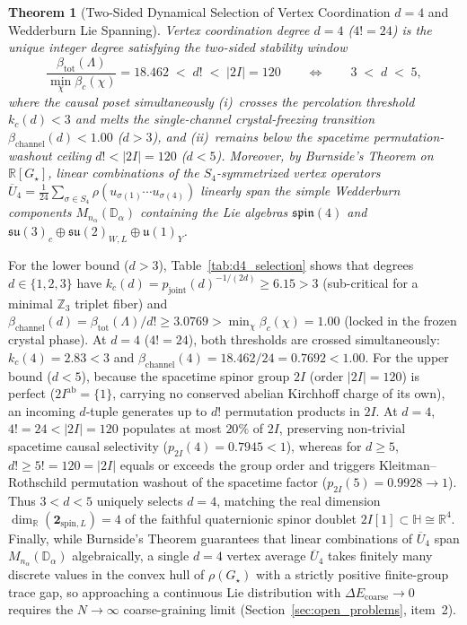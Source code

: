 \documentclass[11pt,a4paper]{article}
\newtheorem{theorem}{Theorem}[section]
\theoremstyle{definition}
\theoremstyle{remark}
\newcommand{\R}{\mathbb{R}}
\newcommand{\quat}{\mathbb{H}}
\newcommand{\Z}{\mathbb{Z}}
\newcommand{\Gstar}{G_\star}
\begin{document}
\begin{theorem}[Two-Sided Dynamical Selection of Vertex Coordination $d=4$ and Wedderburn Lie Spanning]
\label{thm:d4_melting}
Vertex coordination degree $d = 4$ ($4! = 24$) is the unique integer degree satisfying the two-sided stability window
\begin{equation}
\label{eq:d4_window}
\frac{\beta_{\mathrm{tot}}(\Lambda)}{\min_\chi \beta_c(\chi)} = 18.462 \;<\; d! \;<\; |2I| = 120 \qquad\Longleftrightarrow\qquad 3 \;<\; d \;<\; 5,
\end{equation}
where the causal poset simultaneously (i)~crosses the percolation threshold $k_c(d) < 3$ and melts the single-channel crystal-freezing transition $\beta_{\mathrm{channel}}(d) < 1.00$ ($d > 3$), and (ii)~remains below the spacetime permutation-washout ceiling $d! < |2I| = 120$ ($d < 5$). Moreover, by Burnside's Theorem on $\R[\Gstar]$, linear combinations of the $S_4$-symmetrized vertex operators $\overline{U}_4 = \frac{1}{24}\sum_{\sigma \in S_4} \rho(u_{\sigma(1)}\cdots u_{\sigma(4)})$ linearly span the simple Wedderburn components $M_{n_\alpha}(\mathbb{D}_\alpha)$ containing the Lie algebras $\mathfrak{spin}(4)$ and $\mathfrak{su}(3)_c \oplus \mathfrak{su}(2)_{W,L} \oplus \mathfrak{u}(1)_Y$.
\end{theorem}

For the lower bound ($d > 3$), Table~\ref{tab:d4_selection} shows that degrees $d \in \{1, 2, 3\}$ have $k_c(d) = p_{\mathrm{joint}}(d)^{-1/(2d)} \ge 6.15 > 3$ (sub-critical for a minimal $\Z_3$ triplet fiber) and $\beta_{\mathrm{channel}}(d) = \beta_{\mathrm{tot}}(\Lambda)/d! \ge 3.0769 > \min_\chi \beta_c(\chi) = 1.00$ (locked in the frozen crystal phase). At $d = 4$ ($4! = 24$), both thresholds are crossed simultaneously: $k_c(4) = 2.83 < 3$ and $\beta_{\mathrm{channel}}(4) = 18.462 / 24 = 0.7692 < 1.00$. For the upper bound ($d < 5$), because the spacetime spinor group $2I$ (order $|2I| = 120$) is perfect ($2I^{\mathrm{ab}} = \{1\}$, carrying no conserved abelian Kirchhoff charge of its own), an incoming $d$-tuple generates up to $d!$ permutation products in $2I$. At $d = 4$, $4! = 24 < |2I| = 120$ populates at most $20\%$ of $2I$, preserving non-trivial spacetime causal selectivity ($p_{2I}(4) = 0.7945 < 1$), whereas for $d \ge 5$, $d! \ge 5! = 120 = |2I|$ equals or exceeds the group order and triggers Kleitman--Rothschild permutation washout of the spacetime factor ($p_{2I}(5) = 0.9928 \to 1$). Thus $3 < d < 5$ uniquely selects $d = 4$, matching the real dimension $\dim_{\R}(\mathbf{2}_{\mathrm{spin},L}) = 4$ of the faithful quaternionic spinor doublet $2I[1] \subset \quat \cong \R^4$. Finally, while Burnside's Theorem guarantees that linear combinations of $\overline{U}_4$ span $M_{n_\alpha}(\mathbb{D}_\alpha)$ algebraically, a single $d = 4$ vertex average $\overline{U}_4$ takes finitely many discrete values in the convex hull of $\rho(\Gstar)$ with a strictly positive finite-group trace gap, so approaching a continuous Lie distribution with $\Delta E_{\mathrm{coarse}} \to 0$ requires the $N \to \infty$ coarse-graining limit (Section~\ref{sec:open_problems}, item~2).
\end{document}
